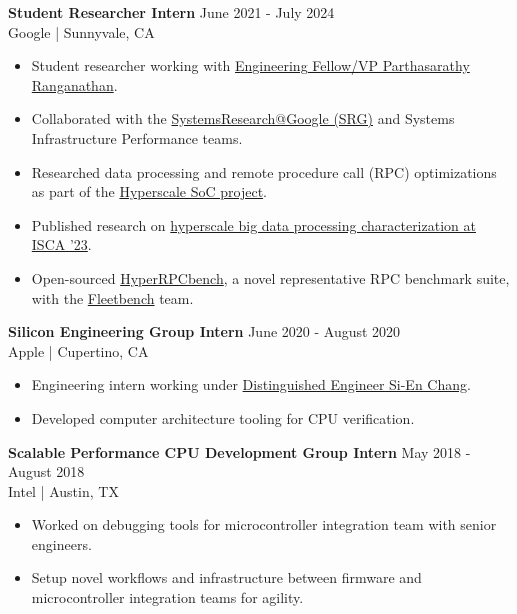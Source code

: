\documentclass[line]{res}
\begin{document}
\begin{resume}
\textbf{Student Researcher Intern} \hfill June 2021 - July 2024
\\
Google | Sunnyvale, CA
\\
\vspace{-3mm}
\begin{itemize}
\item Student researcher working with \href{https://www.parthasarathys.com/}{Engineering Fellow/VP Parthasarathy Ranganathan}.
\item Collaborated with the \href{https://techsysinfra.google/research/}{SystemsResearch@Google (SRG)} and Systems Infrastructure Performance teams.
\item Researched data processing and remote procedure call (RPC) optimizations as part of the \hyperref[sec:hyperscale-soc]{Hyperscale SoC project}.
\item Published research on \hyperref[sec:iscapaper]{hyperscale big data processing characterization at ISCA '23}.
\item Open-sourced \href{https://github.com/google/fleetbench/tree/cd20746b68b307b148a761c676d6400f2541082d/fleetbench/rpc}{HyperRPCbench}, a novel representative RPC benchmark suite, with the \href{https://github.com/google/fleetbench}{Fleetbench} team.
\end{itemize}

\textbf{Silicon Engineering Group Intern} \hfill June 2020 - August 2020
\\
Apple | Cupertino, CA
\\
\vspace{-3mm}
\begin{itemize}
\item Engineering intern working under \href{https://www.linkedin.com/in/sienchang/}{Distinguished Engineer Si-En Chang}.
\item Developed computer architecture tooling for CPU verification.
\end{itemize}

\textbf{Scalable Performance CPU Development Group Intern} \hfill May 2018 - August 2018
\\
Intel | Austin, TX
\\
\vspace{-3mm}
\begin{itemize}
\item Worked on debugging tools for microcontroller integration team with senior engineers.
\item Setup novel workflows and infrastructure between firmware and microcontroller integration teams for agility.
\end{itemize}


\end{resume}
\end{document}
